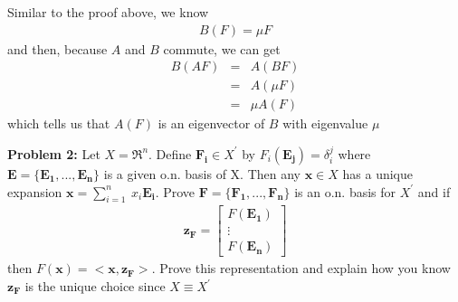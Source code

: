 \documentclass[11pt]{SelfArxOneColBMN}
\begin{document}
\begin{itemize}
  \begin{solution}
    Similar to the proof above, we know
    \begin{eqnarray*}
      B(F) = \mu F
    \end{eqnarray*}
    and then, because $A$ and $B$ commute, we can get
    \begin{eqnarray*}
      B(AF) &=& A(BF)\\
      &=& A(\mu F)\\
      &=& \mu A(F)
    \end{eqnarray*}
    which tells us that $A(F)$ is an eigenvector of $B$ with eigenvalue $\mu$
  \end{solution}
\end{itemize}

\textbf{Problem 2: }Let $X = \Re^n$. Define $\mathbf{F_i} \in X^\prime$ by $F_i(\mathbf{E_j}) = \delta_i^j$ where $\mathbf{E = \{E_1,...,E_n\}}$ is a given o.n. basis of X. Then any $\mathbf{x} \in X$ has a unique expansion $\mathbf{x} = \sum_{i=1}^n\:x_i\mathbf{E_i}$. Prove $\mathbf{F = \{F_1,...,F_n\}}$ is an o.n. basis for $X^\prime$ and if 
\begin{eqnarray*}
\mathbf{z_F} = 
  \begin{bmatrix}
    F(\mathbf{E_1})\\
    \vdots\\
    F(\mathbf{E_n})
  \end{bmatrix}
\end{eqnarray*}
then $F(\mathbf{x}) = <\mathbf{x},\mathbf{z_F}>$. Prove this representation and explain how you know $\mathbf{z_F}$ is the unique choice since $X \equiv X^\prime$
\end{document}
